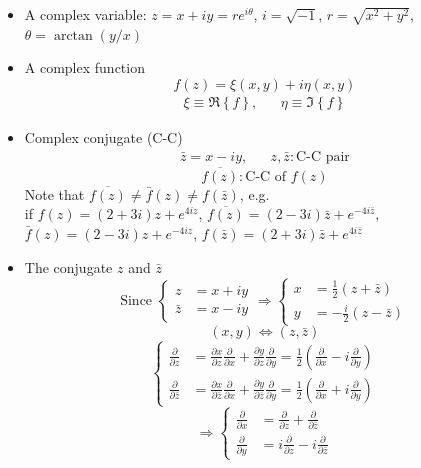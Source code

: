 \begin{itemize}
\item A complex variable: $z = x+iy = re^{i\theta}$, $i= \sqrt{-1}$, $r=\sqrt{x^2 + y^2}$, $\theta = \arctan(y/x)$
\item A complex function
\[
f(z) = \xi(x,y) + i\eta(x,y)
\]
\begin{align*}
\xi\equiv\Re\left\{f\right\}, &&\eta\equiv\Im\left\{f\right\}
\end{align*}
\item Complex conjugate (C-C)
\begin{align*}
\bar{z} = x-iy, && z,\bar{z}\colon\text{C-C pair}
\end{align*}
\[
\overline{f(z)}\colon\text{C-C of }f(z)
\]
Note that $\overline{f(z)}\neq\bar{f}(z)\neq f(\bar{z})$, e.g.\\
if $f(z) = \left(2+3i\right)z+e^{4iz}$, $\overline{f(z)} = \left(2-3i\right)\bar{z}+e^{-4i\bar{z}}$,$\bar{f}(z) = \left(2-3i\right)z + e^{-4iz}$, $f(\bar{z}) = \left(2+3i\right)\bar{z} + e^{4i\bar{z}}$
\item The conjugate $z$ and $\bar{z}$
\[
\text{Since }
\left\{
\begin{aligned}
z &= x+iy \\
\bar{z} &= x-iy
\end{aligned}
\right.
\Longrightarrow
\left\{
\begin{aligned}
x &= \frac{1}{2}\left(z+\bar{z}\right) \\
y &= -\frac{i}{2}\left(z-\bar{z}\right)
\end{aligned}
\right.
\]
\[
(x,y)\Longleftrightarrow (z,\bar{z})
\]
\[
\left\{
\begin{aligned}
\frac{\partial}{\partial z} 
&= \frac{\partial x}{\partial z}\frac{\partial}{\partial x} + \frac{\partial y}{\partial z}\frac{\partial}{\partial y} = \frac{1}{2}\left(\frac{\partial}{\partial x} - i\frac{\partial}{\partial y}\right) \\
\frac{\partial}{\partial \bar{z}} 
&= \frac{\partial x}{\partial \bar{z}}\frac{\partial}{\partial x} + \frac{\partial y}{\partial \bar{z}}\frac{\partial}{\partial y} = \frac{1}{2}\left(\frac{\partial}{\partial x} + i\frac{\partial}{\partial y}\right)
\end{aligned}
\right.
\]
\[
\Longrightarrow
\left\{
\begin{aligned}
\frac{\partial}{\partial x} &= \frac{\partial }{\partial z} + \frac{\partial}{\partial\bar{z}} \\
\frac{\partial}{\partial y} &= i\frac{\partial }{\partial z} - i\frac{\partial}{\partial\bar{z}}

\end{aligned}\]
\end{itemize}
